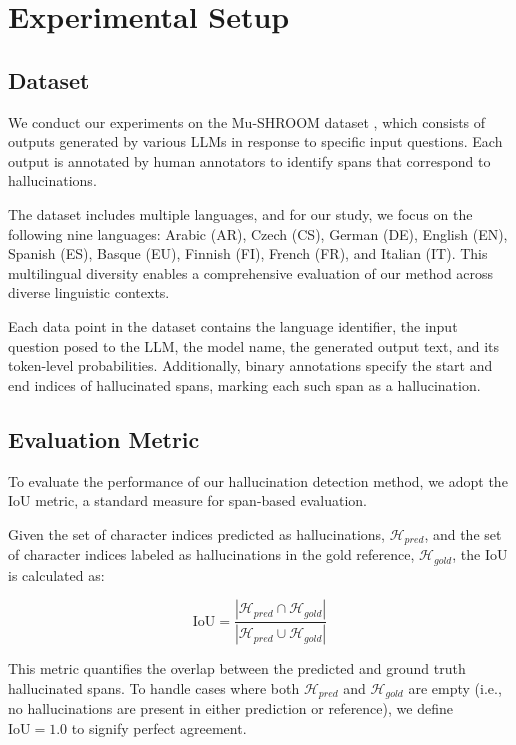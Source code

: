 \section{Experimental Setup}

\subsection{Dataset}
\label{sec:dataset}

We conduct our experiments on the Mu-SHROOM dataset \cite{vazquez-etal-2025-mu-shroom}, which consists of outputs generated by various LLMs in response to specific input questions. 
Each output is annotated by human annotators to identify spans that correspond to hallucinations.

The dataset includes multiple languages, and for our study, we focus on the following nine languages:  Arabic (AR), Czech (CS), German (DE), English (EN), Spanish (ES), Basque (EU), Finnish (FI), French (FR), and Italian (IT).
This multilingual diversity enables a comprehensive evaluation of our method across diverse linguistic contexts.

Each data point in the dataset contains the language identifier, the input question posed to the LLM, the model name, the generated output text, and its token-level probabilities. 
Additionally, binary annotations specify the start and end indices of hallucinated spans, marking each such span as a hallucination.


\subsection{Evaluation Metric}

To evaluate the performance of our hallucination detection method, we adopt the IoU metric, a standard measure for span-based evaluation.

Given the set of character indices predicted as hallucinations, $\mathcal{H}_{pred}$, and the set of character indices labeled as hallucinations in the gold reference, $\mathcal{H}_{gold}$, the IoU is calculated as:

\begin{equation}
\mathrm{IoU} = \frac{|\mathcal{H}_{pred} \cap \mathcal{H}_{gold}|}{|\mathcal{H}_{pred} \cup \mathcal{H}_{gold}|}
\end{equation}

This metric quantifies the overlap between the predicted and ground truth hallucinated spans. To handle cases where both $\mathcal{H}_{pred}$ and $\mathcal{H}_{gold}$ are empty (i.e., no hallucinations are present in either prediction or reference), we define $\mathrm{IoU} = 1.0$ to signify perfect agreement.


